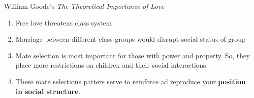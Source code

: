 \documentclass[12pt,a4paper]{article}
\begin{document}
\begin{enumerate}
\begin{enumerate}
\begin{enumerate}
\begin{itemize}
\begin{eg}{William Goode's \textit{The Theoretical Importance of Love}}
\begin{enumerate}
						\item Free love threatens class system
						\item Marriage between different class groups would disrupt social status of group
						\item Mate selection is most important for those with power and property. So, they place more restrictions on children and their social interactions.
						\item These mate selections patters serve to reinforce ad reproduce your \textbf{position in social structure}.
					\end{enumerate}
				\end{eg}
			\end{itemize}
		\end{enumerate}
	\end{enumerate}
\end{enumerate}
\end{document}
